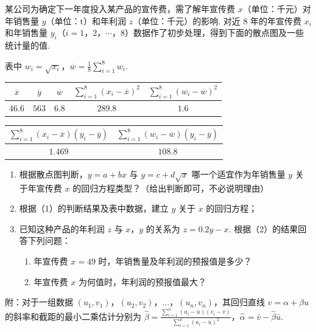 \begin{problem}
某公司为确定下一年度投入某产品的宣传费，需了解年宣传费 \(x\)（单位：\(\text{千元}\)）对年销售量 \(y\)（单位：\(\mathrm{t}\)）和年利润 \(z\)（单位：\(\text{千元}\)）的影响. 对近 \(8\) 年的年宣传费 \(x_i\) 和年销售量 \(y_i\)（\(i = 1\)，\(2\)，\(\cdots\)，\(8\)）数据作了初步处理，得到下面的散点图及一些统计量的值.

表中 \(w_i = \sqrt{x_i}\)，\(\overline{w} = \frac{1}{8}\sum_{i=1}^{8}w_i\).

\begin{center}
\renewcommand{\arraystretch}{1.2}
\begin{tabular}{|c|c|c|c|c|}
\hline
\(\overline{x}\) & \(\overline{y}\) & \(\overline{w}\) & \(\displaystyle\sum_{i=1}^{8}(x_i-\overline{x})^2\) & \(\displaystyle\sum_{i=1}^{8}(w_i-\overline{w})^2\) \\
\hline
\(46.6\) & \(563\) & \(6.8\) & \(289.8\) & \(1.6\) \\
\hline
\end{tabular}

\vspace{0.4em}

\begin{tabular}{|c|c|}
\hline
\(\displaystyle\sum_{i=1}^{8}(x_i-\overline{x})(y_i-\overline{y})\) & \(\displaystyle\sum_{i=1}^{8}(w_i-\overline{w})(y_i-\overline{y})\) \\
\hline
\(1.469\) & \(108.8\) \\
\hline
\end{tabular}
\end{center}

\begin{enumerate}
\item 根据散点图判断，\(y = a + bx\) 与 \(y = c + d\sqrt{x}\) 哪一个适宜作为年销售量 \(y\) 关于年宣传费 \(x\) 的回归方程类型？（给出判断即可，不必说明理由）
\item 根据（1）的判断结果及表中数据，建立 \(y\) 关于 \(x\) 的回归方程；
\item 已知这种产品的年利润 \(z\) 与 \(x\)，\(y\) 的关系为 \(z = 0.2y - x\). 根据（2）的结果回答下列问题：
\begin{enumerate}
\item 年宣传费 \(x = 49\) 时，年销售量及年利润的预报值是多少？
\item 年宣传费 \(x\) 为何值时，年利润的预报值最大？
\end{enumerate}
\end{enumerate}

附：对于一组数据 \((u_{1},v_{1})\)，\((u_{2},v_{2})\)，\(\dots\)，\((u_{n},v_{n})\)，其回归直线 \(v = \alpha + \beta u\) 的斜率和截距的最小二乘估计分别为 \(\hat{\beta} = \frac{\sum_{i=1}^{n}(u_i - \bar{u})(v_i - \bar{v})}{\sum_{i=1}^{n}(u_i - \bar{u})^2}\)，\(\hat{\alpha} = \bar{v} - \hat{\beta}\bar{u}\).

\end{problem}

